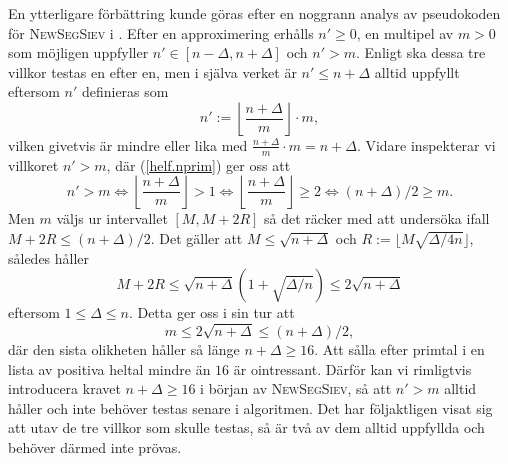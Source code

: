 En ytterligare förbättring kunde göras efter en noggrann analys av pseudokoden för \textsc{NewSegSiev} i \cite[s.338]{HaraldSieve}.
Efter en approximering erhålls $n'\geq0$, en multipel av $m>0$ som möjligen uppfyller $n'\in[n-\Delta,n+\Delta]$ och $n'>m$.
Enligt \cite{HaraldSieve} ska dessa tre villkor testas en efter en,
men i själva verket är $n'\leq n+\Delta$ alltid uppfyllt eftersom $n'$ definieras som
\begin{equation} \label{helf.nprim}
    n' := \left\lfloor \frac{n+\Delta}{m} \right\rfloor\cdot m,
\end{equation}
vilken givetvis är mindre eller lika med $\frac{n+\Delta}{m}\cdot m = n+\Delta$. 
Vidare inspekterar vi villkoret $n'>m$, där (\ref{helf.nprim}) ger oss att 
\begin{equation*}
    n'>m \iff
    \left\lfloor \frac{n+\Delta}{m} \right\rfloor > 1 \iff
    \left\lfloor \frac{n+\Delta}{m} \right\rfloor \geq 2 \iff
    (n+\Delta)/2\geq m.
\end{equation*}
Men $m$ väljs ur intervallet $[M,M+2R]$ så det räcker med att undersöka ifall $M+2R\leq(n+\Delta)/2$. 
Det gäller att $M\leq\sqrt{n+\Delta}$ och $R:=\lfloor M\sqrt{\Delta/4n}\rfloor$,
således håller 
\begin{equation*}
    M+2R \leq
    \sqrt{n+\Delta}\left(1+ \sqrt{\Delta/n}\right) \leq 2\sqrt{n+\Delta}
\end{equation*}
eftersom $1\leq\Delta\leq n$. Detta ger oss i sin tur att
\begin{equation*}
    m \leq 2\sqrt{n+\Delta} \leq (n+\Delta)/2,
\end{equation*}
där den sista olikheten håller så länge $n+\Delta\geq16$. 
Att sålla efter primtal i en lista av positiva heltal mindre än $16$ är ointressant.
Därför kan vi rimligtvis introducera kravet $n+\Delta\geq16$ i början av \textsc{NewSegSiev},
så att $n'>m$ alltid håller och inte behöver testas senare i algoritmen.
Det har följaktligen visat sig att utav de tre villkor som skulle testas, så är två av dem alltid uppfyllda och behöver därmed inte prövas.


